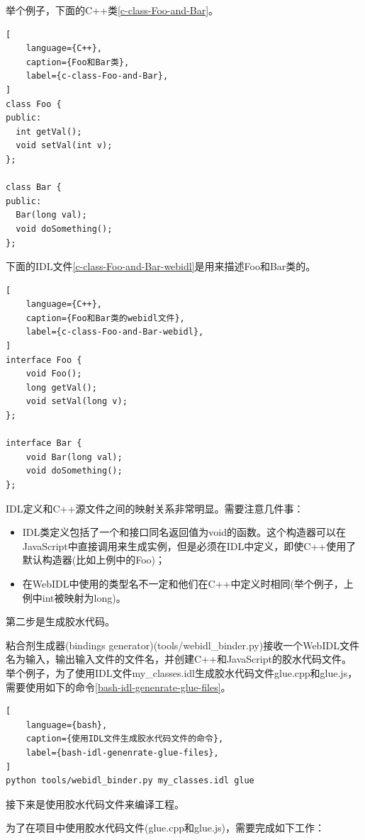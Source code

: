 举个例子，下面的C++类\ref{c-class-Foo-and-Bar}。

\begin{lstlisting}[
    language={C++},
    caption={Foo和Bar类},
    label={c-class-Foo-and-Bar},
]
class Foo {
public:
  int getVal();
  void setVal(int v);
};

class Bar {
public:
  Bar(long val);
  void doSomething();
};
\end{lstlisting}

\newpage

下面的IDL文件\ref{c-class-Foo-and-Bar-webidl}是用来描述Foo和Bar类的。

\begin{lstlisting}[
    language={C++},
    caption={Foo和Bar类的webidl文件},
    label={c-class-Foo-and-Bar-webidl},
]
interface Foo {
    void Foo();
    long getVal();
    void setVal(long v);
};

interface Bar {
    void Bar(long val);
    void doSomething();
};
\end{lstlisting}

IDL定义和C++源文件之间的映射关系非常明显。需要注意几件事：

\begin{itemize}[itemindent=2em]
    \item IDL类定义包括了一个和接口同名返回值为void的函数。这个构造器可以在JavaScript中直接调用来生成实例，但是必须在IDL中定义，即使C++使用了默认构造器(比如上例中的Foo)；
    \item 在WebIDL中使用的类型名不一定和他们在C++中定义时相同(举个例子，上例中int被映射为long)。
\end{itemize}

第二步是生成胶水代码。

粘合剂生成器(bindings generator)(tools/webidl\_binder.py)接收一个WebIDL文件名为输入，输出输入文件的文件名，并创建C++和JavaScript的胶水代码文件。
举个例子，为了使用IDL文件my\_classes.idl生成胶水代码文件glue.cpp和glue.js，需要使用如下的命令\ref{bash-idl-genenrate-glue-files}。

\begin{lstlisting}[
    language={bash},
    caption={使用IDL文件生成胶水代码文件的命令},
    label={bash-idl-genenrate-glue-files},
]
python tools/webidl_binder.py my_classes.idl glue
\end{lstlisting}

接下来是使用胶水代码文件来编译工程。

为了在项目中使用胶水代码文件(glue.cpp和glue.js)，需要完成如下工作：

